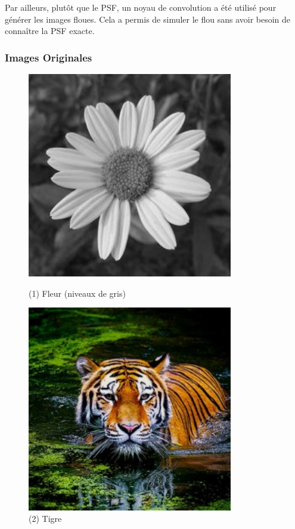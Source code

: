Par ailleurs, plutôt que le PSF, un noyau de convolution a été utilisé pour générer les images floues. Cela a permis de simuler le flou sans avoir besoin de connaître la PSF exacte.

\subsubsection{Images Originales}

\begin{figure}[h!]
    \centering
    \begin{minipage}[b]{0.45\textwidth}
        \centering
        \includegraphics[width=0.8\textwidth]{images/originals/flower.jpg}
        \caption*{(1) Fleur (niveaux de gris)}
    \end{minipage}
    \begin{minipage}[b]{0.45\textwidth}
        \centering
        \includegraphics[width=0.8\textwidth]{images/originals/tiger.jpeg}
        \caption*{(2) Tigre}
    \end{minipage}
\end{figure}

